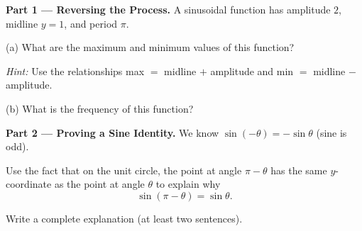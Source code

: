 \documentclass[10pt]{article}
\begin{document}
\vspace{0.1in}

\begin{tcolorbox}[colback=white, colframe=black!40,
    title=\textbf{Tier E --- Extend},
    fonttitle=\bfseries, arc=2mm, left=3mm, right=3mm, top=2mm, bottom=2mm]

\textbf{Part 1 --- Reversing the Process.}
A sinusoidal function has amplitude $2$, midline $y = 1$, and period $\pi$.

\medskip
(a) What are the maximum and minimum values of this function?

\medskip
\textit{Hint:} Use the relationships
max $= $ midline $+$ amplitude and min $= $ midline $-$ amplitude.


\medskip
(b) What is the frequency of this function?


\vspace{0.1in}

\textbf{Part 2 --- Proving a Sine Identity.}
We know $\sin(-\theta) = -\sin\theta$ (sine is odd).

\medskip
Use the fact that on the unit circle, the point at angle $\pi - \theta$ has the
same $y$-coordinate as the point at angle $\theta$ to explain why
\[
  \sin(\pi - \theta) = \sin\theta.
\]

Write a complete explanation (at least two sentences).


\end{tcolorbox}
\end{document}
